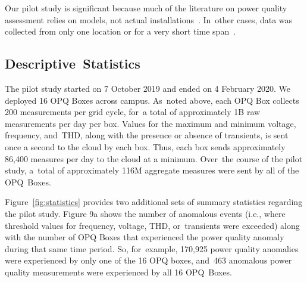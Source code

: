 \documentclass[energies,article,accept,moreauthors,pdftex]{Definitions/mdpi}
\begin{document}
Our pilot study is significant because much of the literature on power quality assessment relies on models, not actual installations~\cite{anurangi_effects_2017,bayindir_effects_2016,farhoodnea_power_2012,shafiullah_experimental_2014}. In~other cases, data was collected from only one location or for a very short time span~\cite{kucuk_assessment_2013,viciana_openzmeter_2018}.

\subsection{Descriptive~Statistics}

The pilot study started on 7 October 2019 and ended on 4 February 2020. We deployed 16 OPQ Boxes across campus. As~noted above, each OPQ Box collects 200 measurements per grid cycle, for~a total of approximately 1B raw measurements per day per box. Values for the maximum and minimum voltage, frequency, and~THD, along with the presence or absence of transients, is sent once a second to the cloud by each box. Thus, each box sends approximately 86,400 measures per day to the cloud at a minimum. Over~the course of the pilot study, a~total of approximately 116M aggregate measures were sent by all of the OPQ~Boxes.

Figure~\ref{fig:statistics} provides two additional sets of summary statistics regarding the pilot study. Figure 9a shows the number of anomalous events (i.e., where threshold values for frequency, voltage, THD, or~transients were exceeded) along with the number of OPQ Boxes that experienced the power quality anomaly during that same time period. So, for~example, 170,925 power quality anomalies were experienced by only one of the 16 OPQ boxes, and~463 anomalous power quality measurements were experienced by all 16 OPQ~Boxes.
\end{document}
